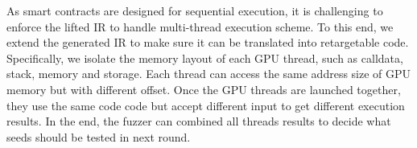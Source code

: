 \noindent \textbf{{\wrapper}}
As smart contracts are designed for sequential execution, it is challenging to enforce the lifted IR to handle multi-thread execution scheme. 
To this end, we extend the generated IR to make sure it can be translated into retargetable code.
Specifically, we isolate the memory layout of each GPU thread, such as calldata, stack, memory and storage.
Each thread can access the same address size of GPU memory but with different offset. Once the GPU threads are launched together, they use the same code code but accept different input to get different execution results. In the end, the fuzzer can combined all threads results to decide what seeds should be tested in next round.